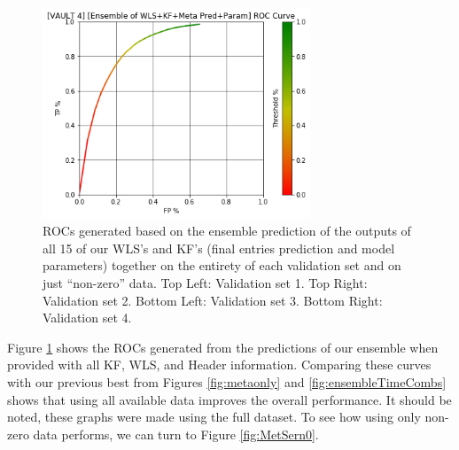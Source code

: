\begin{figure}[h]
\includegraphics[width=8cm]{body/results/Graphs/Meta+Series/Raw/v4.png}
\caption{ROCs generated based on the ensemble prediction of the outputs of all 15 of our WLS's and KF's (final entries prediction and model parameters) together on the entirety of each validation set and on just ``non-zero'' data. Top Left: Validation set 1. Top Right: Validation set 2. Bottom Left: Validation set 3. Bottom Right: Validation set 4.}
\label{fig:MetSer0}
\end{figure}

Figure \ref{fig:MetSer0} shows the ROCs generated from the predictions of our ensemble when provided with all KF, WLS, and Header information. Comparing these curves with our previous best from Figures \ref{fig:metaonly} and \ref{fig:ensembleTimeCombs} shows that using all available data improves the overall performance. It should be noted, these graphs were made using the full dataset. To see how using only non-zero data performs, we can turn to Figure \ref{fig:MetSern0}.

\pagebreak

